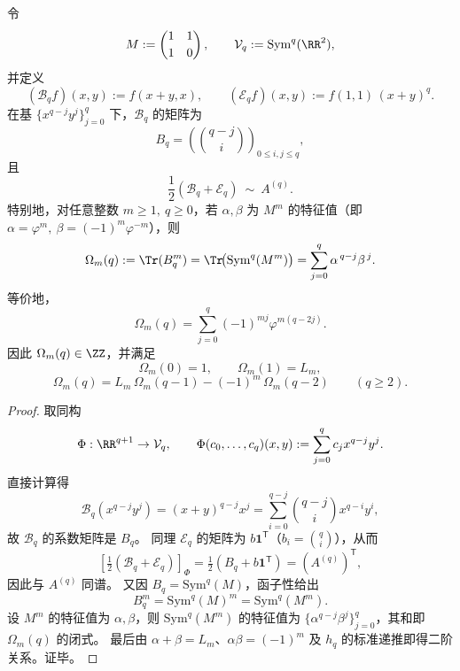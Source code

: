 \begin{conclusion}\label{con:xi-replica-softcore-exceptional-symq-evaluation-coupling}
令
\[
M:=\begin{pmatrix}1&1\\[2pt]1&0\end{pmatrix},\qquad
\mathcal V_q:=\mathrm{Sym}^q(\RR^2),
\]
并定义
\[
(\mathcal B_q f)(x,y):=f(x+y,x),\qquad
(\mathcal E_q f)(x,y):=f(1,1)\,(x+y)^q.
\]
在基 \(\{x^{q-j}y^j\}_{j=0}^{q}\) 下，\(\mathcal B_q\) 的矩阵为
\[
B_q=(\binom{q-j}{i})_{0\le i,j\le q},
\]
且
\[
\frac12(\mathcal B_q+\mathcal E_q)\ \sim\ A^{(q)}.
\]
特别地，对任意整数 \(m\ge1,\ q\ge0\)，若 \(\alpha,\beta\) 为 \(M^m\) 的特征值（即
\(\alpha=\varphi^m,\ \beta=(-1)^m\varphi^{-m}\)），则
\[
\Omega_m(q):=\Tr(B_q^m)
=\Tr\!\bigl(\mathrm{Sym}^q(M^m)\bigr)
=\sum_{j=0}^{q}\alpha^{\,q-j}\beta^{\,j}.
\]
等价地，
\[
\Omega_m(q)=\sum_{j=0}^{q}(-1)^{mj}\varphi^{m(q-2j)}.
\]
因此 \(\Omega_m(q)\in\ZZ\)，并满足
\[
\Omega_m(0)=1,\qquad \Omega_m(1)=L_m,
\]
\[
\Omega_m(q)=L_m\,\Omega_m(q-1)-(-1)^m\,\Omega_m(q-2)\qquad(q\ge2).
\]
\end{conclusion}
\begin{proof}
取同构
\[
\Phi:\RR^{q+1}\to\mathcal V_q,\qquad
\Phi(c_0,\dots,c_q)(x,y):=\sum_{j=0}^{q}c_jx^{q-j}y^j.
\]
直接计算得
\[
\mathcal B_q(x^{q-j}y^j)=(x+y)^{q-j}x^j
=\sum_{i=0}^{q-j}\binom{q-j}{i}x^{q-i}y^i,
\]
故 \(\mathcal B_q\) 的系数矩阵是 \(B_q\)。
同理 \(\mathcal E_q\) 的矩阵为 \(b\mathbf1^{\mathsf T}\)（\(b_i=\binom qi\)），从而
\[
[\tfrac12(\mathcal B_q+\mathcal E_q)]_{\Phi}
=\tfrac12(B_q+b\mathbf1^{\mathsf T})
=(A^{(q)})^{\mathsf T},
\]
因此与 \(A^{(q)}\) 同谱。
又因 \(B_q=\mathrm{Sym}^q(M)\)，函子性给出
\[
B_q^m=\mathrm{Sym}^q(M)^m=\mathrm{Sym}^q(M^m).
\]
设 \(M^m\) 的特征值为 \(\alpha,\beta\)，则 \(\mathrm{Sym}^q(M^m)\) 的特征值为
\(\{\alpha^{q-j}\beta^j\}_{j=0}^{q}\)，其和即 \(\Omega_m(q)\) 的闭式。
最后由
\(\alpha+\beta=L_m\)、\(\alpha\beta=(-1)^m\)
及 \(h_q\) 的标准递推即得二阶关系。证毕。
\end{proof}

